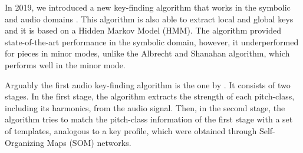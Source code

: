 


In 2019, we introduced a new key-finding algorithm that
works in the symbolic and audio domains
\parencite{napoleslopez2019keyfinding}. This algorithm is
also able to extract local and global keys and it is based
on a Hidden Markov Model (HMM). The algorithm provided
state-of-the-art performance in the symbolic domain,
however, it underperformed for pieces in minor modes, unlike
the Albrecht and Shanahan algorithm, which performs well in
the minor mode.




Arguably the first audio key-finding algorithm is the one by
\textcite{leman1992een}. It consists of two stages. In the
first stage, the algorithm extracts the strength of each
pitch-class, including its harmonics, from the audio signal.
Then, in the second stage, the algorithm tries to match the
pitch-class information of the first stage with a set of
templates, analogous to a key profile, which were obtained
through Self-Organizing Maps (SOM) networks.


